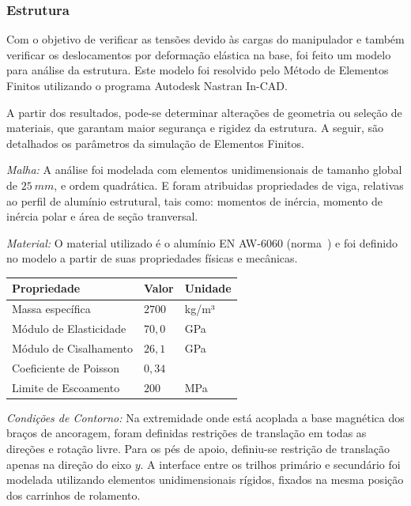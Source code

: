 \subsubsection{Estrutura}

Com o objetivo de verificar as tensões devido às cargas do manipulador e também
verificar os deslocamentos por deformação elástica na base, foi feito um modelo
para análise da estrutura. Este modelo foi resolvido pelo Método de
Elementos Finitos utilizando o programa Autodesk\textregistered{}
Nastran\textregistered{} In-CAD.

A partir dos resultados, pode-se determinar alterações de geometria ou seleção
de materiais, que garantam maior segurança e rigidez da estrutura.
A seguir, são detalhados os parâmetros da simulação de Elementos Finitos.

\textit{Malha:} A análise foi modelada com elementos unidimensionais
de tamanho global de $25~mm$, e ordem quadrática.  E foram atribuidas propriedades
de viga, relativas ao perfil de alumínio estrutural, tais como:
momentos de inércia, momento de inércia polar e área de seção tranversal.

\textit{Material:} O material utilizado é o alumínio EN AW-6060
(norma~\cite{DIN_2007}) e foi definido no modelo a partir de suas propriedades físicas e mecânicas.

\begin{center}
\centering
\begin{tabular}{|l|l|l|}
\hline
\textbf{Propriedade}   & \textbf{Valor}   & \textbf{Unidade}  \\ \hline
Massa específica       & $2700$           & kg/m³             \\ \hline
Módulo de Elasticidade & $70,0$           & GPa               \\ \hline
Módulo de Cisalhamento & $26,1$           & GPa               \\ \hline
Coeficiente de Poisson & $0,34$           &                   \\ \hline
Limite de Escoamento   & $200$            & MPa               \\ \hline
\end{tabular}
\label{tab::prop_material}
\end{center}


\textit{Condições de Contorno:} Na extremidade onde está acoplada a base
magnética dos braços de ancoragem, foram definidas restrições de translação
em todas as direções e rotação livre. Para os pés de apoio, definiu-se restrição
de translação apenas na direção do eixo $y$. A interface entre os trilhos
primário e secundário foi modelada utilizando elementos unidimensionais rígidos, fixados na
mesma posição dos carrinhos de rolamento.

